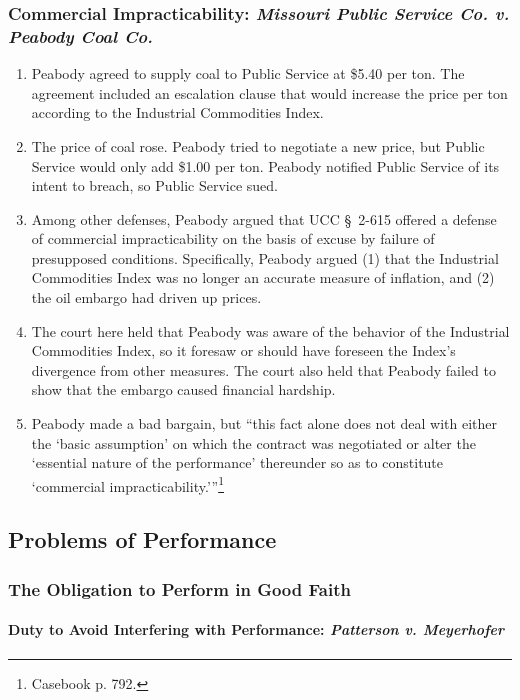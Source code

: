 \subsubsection{Commercial Impracticability: \emph{Missouri Public Service Co. 
v. Peabody Coal Co.}}

\begin{enumerate}
    \item Peabody agreed to supply coal to Public Service at \$5.40 per ton.  
    The agreement included an escalation clause that would increase the price 
    per ton according to the Industrial Commodities Index.
    \item The price of coal rose. Peabody tried to negotiate a new price, but 
    Public Service would only add \$1.00 per ton. Peabody notified Public 
    Service of its intent to breach, so Public Service sued.
    \item Among other defenses, Peabody argued that UCC \S\ 2-615 offered a 
    defense of commercial impracticability on the basis of excuse by failure 
    of presupposed conditions. Specifically, Peabody argued (1) that the 
    Industrial Commodities Index was no longer an accurate measure of 
    inflation, and (2) the oil embargo had driven up prices.
    \item The court here held that Peabody was aware of the behavior of the 
    Industrial Commodities Index, so it foresaw or should have foreseen the 
    Index's divergence from other measures. The court also held that Peabody 
    failed to show that the embargo caused financial hardship.
    \item Peabody made a bad bargain, but \enquote{this fact alone does not 
    deal with either the `basic assumption' on which the contract was 
    negotiated or alter the `essential nature of the performance' thereunder 
    so as to constitute `commercial impracticability.'}\footnote{Casebook p.  
    792.}
\end{enumerate}

\subsection{Problems of Performance}

\subsubsection{The Obligation to Perform in Good Faith}

\paragraph{Duty to Avoid Interfering with Performance: \emph{Patterson v. 
Meyerhofer}}

